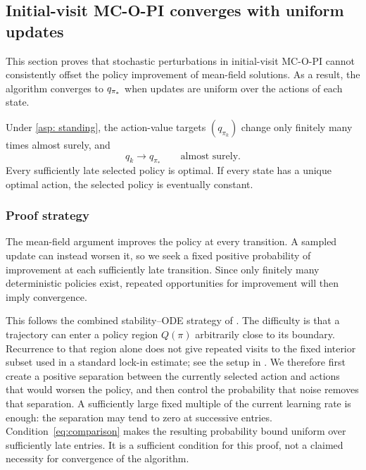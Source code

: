 \subsection{Initial-visit MC-O-PI converges with uniform updates}
This section proves that stochastic perturbations in initial-visit MC-O-PI cannot consistently offset the policy improvement of mean-field solutions. As a result, the algorithm converges to $q_{{\pi}_*}$ when updates are uniform over the actions of each state.

\begin{theorem}
\label{thm: convergence mcopi uniform}
Under \autoref{asp: standing}, the action-value targets $(q_{\pi_k})$ change only finitely many times almost surely, and
\[
q_k\longrightarrow q_{\pi_*}\qquad\text{almost surely}.
\]
Every sufficiently late selected policy is optimal. If every state has a unique optimal action, the selected policy is eventually constant.
\end{theorem}

\subsubsection{Proof strategy}
\label{sec: limitations of existing methods}
The mean-field argument improves the policy at every transition. A sampled update can instead worsen it, so we seek a fixed positive probability of improvement at each sufficiently late transition. Since only finitely many deterministic policies exist, repeated opportunities for improvement will then imply convergence.

This follows the combined stability--ODE strategy of \citet[Section~5.4]{Kushner2003StochasticApplications}. The difficulty is that a trajectory can enter a policy region $Q(\pi)$ arbitrarily close to its boundary. Recurrence to that region alone does not give repeated visits to the fixed interior subset used in a standard lock-in estimate; see the setup in \citet[Section~3]{Borkar2002OnApproximation}.
We therefore first create a positive separation between the currently selected action and actions that would worsen the policy, and then control the probability that noise removes that separation. A sufficiently large fixed multiple of the current learning rate is enough: the separation may tend to zero at successive entries. Condition~\eqref{eq:comparison} makes the resulting probability bound uniform over sufficiently late entries. It is a sufficient condition for this proof, not a claimed necessity for convergence of the algorithm.

